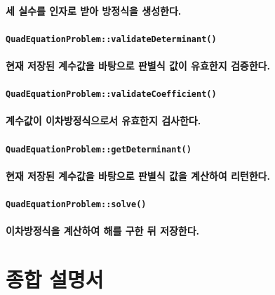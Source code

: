\documentclass[UTF8]{report}
\begin{document}
            \paragraph{%
                \normalfont 세 실수를 인자로 받아 방정식을 생성한다.
            }
            
            \paragraph{\texttt{QuadEquationProblem::validateDeterminant()}}
            \paragraph{%
                \normalfont 현재 저장된 계수값을 바탕으로 판별식 값이 유효한지 검증한다.
            }
            
            \paragraph{\texttt{QuadEquationProblem::validateCoefficient()}}
            \paragraph{%
                \normalfont 계수값이 이차방정식으로서 유효한지 검사한다.
            }
            
            \paragraph{\texttt{QuadEquationProblem::getDeterminant()}}
            \paragraph{%
                \normalfont 현재 저장된 계수값을 바탕으로 판별식 값을 계산하여 리턴한다.
            }
            
            \paragraph{\texttt{QuadEquationProblem::solve()}}
            \paragraph{%
                \normalfont 이차방정식을 계산하여 해를 구한 뒤 저장한다.
            }

        \section{종합 설명서}
\end{document}

